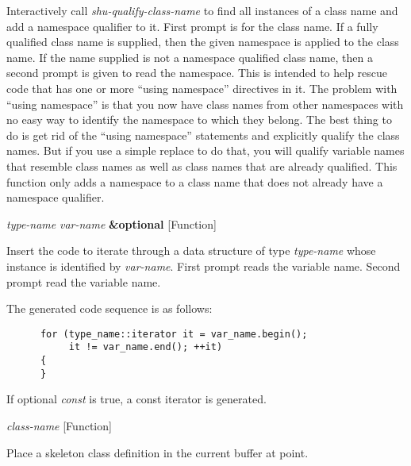 \begin{doc-string}
Interactively call \emph{shu-qualify-class-name} to find all instances of a class name and
add a namespace qualifier to it.  First prompt is for the class name.  If a fully qualified
class name is supplied, then the given namespace is applied to the class name.  If the name
supplied is not a namespace qualified class name, then a second prompt is given to read the
namespace.
This is intended to help rescue code that has one or more ``using namespace''
directives in it.  The problem with ``using namespace'' is that you now have
class names from other namespaces with no easy way to identify the namespace
to which they belong.  The best thing to do is get rid of the ``using
namespace'' statements and explicitly qualify the class names.  But if you
use a simple replace to do that, you will qualify variable names that resemble
class names as well as class names that are already qualified.  This function
only adds a namespace to a class name that does not already have a namespace
qualifier.
\end{doc-string}

\vspace{1em}
\noindent
{}
\usebox{\funcname}\emph{type-name} \emph{var-name} \textbf{\&optional}
 \hfill [Function]
\hspace*{\wd\funcname}

\begin{doc-string}
Insert the code to iterate through a data structure of type \emph{type-name} whose
instance is identified by \emph{var-name}.  First prompt reads the variable name.
Second prompt read the variable name.

The generated code sequence is as follows:

\small{\begin{verbatim}
      for (type_name::iterator it = var_name.begin();
           it != var_name.end(); ++it)
      {
      }
\end{verbatim}}

If optional \emph{const} is true, a const iterator is generated.
\end{doc-string}

\vspace{1em}
\noindent
{}
\usebox{\funcname}\emph{class-name}
 \hfill [Function]

\begin{doc-string}
Place a skeleton class definition in the current buffer at point.
\end{doc-string}

